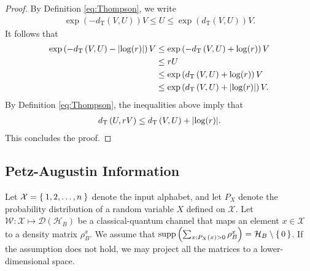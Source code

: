 \documentclass{article}
\DeclareMathOperator{\supp}{supp}
\begin{document}
\begin{proof}
    By Definition \ref{eq:Thompson}, we write
    \begin{align}
        \exp\left(-d_{\mathrm{T}}\left(V,U\right)\right)V
        \leq U
        \leq \exp\left(d_{\mathrm{T}}\left(V,U\right)\right)V.
    \end{align}
    It follows that
    \begin{align}
        \exp\left(-d_{\mathrm{T}}\left(V,U\right)-\abs{\log(r)}\right)V
        &\leq\exp\left(-d_{\mathrm{T}}\left(V,U\right)+\log(r)\right)V\nonumber\\
        &\leq rU\nonumber\\
        &\leq \exp\left(d_{\mathrm{T}}\left(V,U\right)+\log(r)\right)V\nonumber\\
        &\leq \exp\left(d_{\mathrm{T}}\left(V,U\right)+\abs{\log(r)}\right)V.\nonumber
    \end{align}
    By Definition \ref{eq:Thompson}, the inequalities above imply that 
    \begin{align}
        d_{\mathrm{T}}\left(U,rV\right)
        \leq d_{\mathrm{T}}\left(V,U\right)+\abs{\log(r)}.
    \end{align}
    This concludes the proof.
\end{proof}
 
\subsection{Petz-Augustin Information}
\label{Sec:PetzAug}
Let 
$\mathcal{X}=
\Set{1,2,\dots,n}$
denote the input alphabet, and let  $P_{X}$ denote the probability distribution of 
a
random variable $X$ defined on $\mathcal{X}$. 
Let $\mathcal{W}:\mathcal{X}\mapsto\mathcal{D}(\mathcal{H}_B)$ be 
a
classical-quantum channel that maps an element $x\in \mathcal{X}$ to a density matrix $\rho_B^x$.
We assume that $\supp\left(\sum_{x:P_X(x)>0}\rho_B^x\right) = \mathcal{H}_B \setminus \set{0}$.
If the assumption does not hold, we may project all the matrices to a lower-dimensional space.
\end{document}
